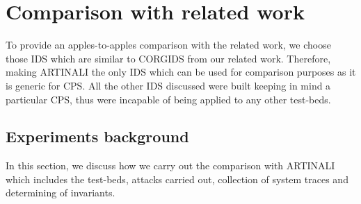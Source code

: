 
\chapter{Comparison with related work}
\label{ch:comparisonwithrelatedwork}

To provide an apples-to-apples comparison with the related work, we choose those IDS which are similar to CORGIDS from our related work. Therefore, making ARTINALI the only IDS which can be used for comparison purposes as it is generic for CPS. All the other IDS discussed were built keeping in mind a particular CPS, thus were incapable of being applied to any other test-beds.

\section{Experiments background}
In this section, we discuss how we carry out the comparison with ARTINALI which includes the test-beds, attacks carried out, collection of system traces and determining of invariants. 
